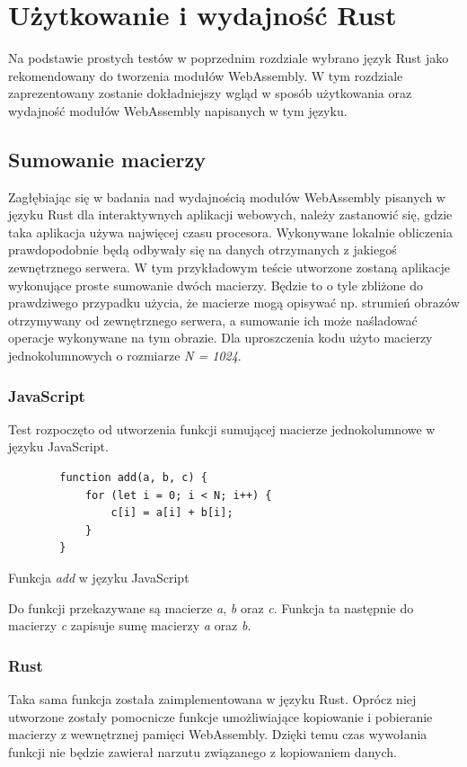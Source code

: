 \documentclass[language=polish,type=master]{aghmodern}
\begin{document}
\chapter{Użytkowanie i wydajność Rust}
Na podstawie prostych testów w poprzednim rozdziale wybrano język Rust jako rekomendowany do tworzenia modułów WebAssembly.
W tym rozdziale zaprezentowany zostanie dokładniejszy wgląd w sposób użytkowania oraz wydajność modułów WebAssembly napisanych w tym języku.

\section{Sumowanie macierzy}
Zagłębiając się w badania nad wydajnością modułów WebAssembly pisanych w języku Rust dla interaktywnych aplikacji webowych, należy zastanowić się, gdzie taka aplikacja używa najwięcej czasu procesora.
Wykonywane lokalnie obliczenia prawdopodobnie będą odbywały się na danych otrzymanych z jakiegoś zewnętrznego serwera.
W tym przykładowym teście utworzone zostaną aplikacje wykonujące proste sumowanie dwóch macierzy.
Będzie to o tyle zbliżone do prawdziwego przypadku użycia, że macierze mogą opisywać np. strumień obrazów otrzymywany od zewnętrznego serwera, a sumowanie ich może naśladować operacje wykonywane na tym obrazie.
Dla uproszczenia kodu użyto macierzy jednokolumnowych o rozmiarze \emph{N = 1024}.

\subsection{JavaScript}
Test rozpoczęto od utworzenia funkcji sumującej macierze jednokolumnowe w języku JavaScript.

\begin{listing}[H]
    \begin{verbatim}
        function add(a, b, c) {
            for (let i = 0; i < N; i++) {
                c[i] = a[i] + b[i];
            }
        }
    \end{verbatim}
    \caption{Funkcja \emph{add} w języku JavaScript}
\end{listing}

Do funkcji przekazywane są macierze \emph{a}, \emph{b} oraz \emph{c}.
Funkcja ta następnie do macierzy \emph{c} zapisuje sumę macierzy \emph{a} oraz \emph{b}.

\subsection{Rust}
Taka sama funkcja została zaimplementowana w języku Rust.
Oprócz niej utworzone zostały pomocnicze funkcje umożliwiające kopiowanie i pobieranie macierzy z wewnętrznej pamięci WebAssembly.
Dzięki temu czas wywołania funkcji nie będzie zawierał narzutu związanego z kopiowaniem danych.
\end{document}
